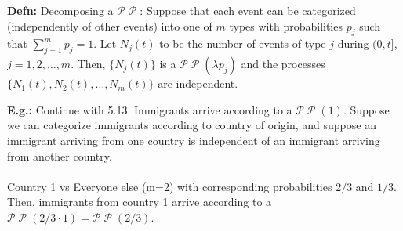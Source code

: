 \documentclass[a4paper]{article}
\newcommand{\n}{\hfill\break}
\newcommand{\defn}[1]{\par\noindent\settowidth{\hangindent}{\textbf{Defn: }}\textbf{Defn: }#1\n}
\newcommand{\eg}[1]{\par\noindent\settowidth{\hangindent}{\textbf{E.g.: }}\textbf{E.g.: }#1\n}
\DeclareMathOperator{\Poiss}{\mathcal{P}}
\begin{document}
\defn{
Decomposing a $\mathcal{P}\Poiss$: Suppose that each event can be categorized (independently of other events) into one of $m$ types with probabilities $p_j$ such that $\sum^m_{j=1}p_j=1$. Let $N_j(t)$ to be the number of events of type $j$ during $(0,t]$, $j=1,2,\dots,m$. Then, $\{N_j(t)\}$ is a $\mathcal{P}\Poiss(\lambda p_j)$ and the processes $\{N_1(t), N_2(t),\dots,N_m(t)\}$ are independent.
}

\eg{
Continue with 5.13. Immigrants arrive according to a $\mathcal{P}\Poiss(1)$. Suppose we can categorize immigrants according to country of origin, and suppose an immigrant arriving from one country is independent of an immigrant arriving from another country.
\\\\
Country 1 vs Everyone else (m=2) with corresponding probabilities $2/3$ and $1/3$. Then, immigrants from country 1 arrive according to a $\mathcal{P}\Poiss(2/3\cdot1)=\mathcal{P}\Poiss(2/3)$.
}
\end{document}
